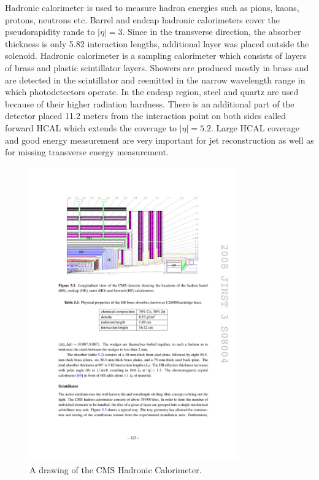 Hadronic calorimeter is used to measure hadron energies such as pions, kaons, protons, neutrons etc. Barrel and endcap hadronic calorimeters cover the pseudorapidity rande to $|\eta|=3$. 
Since in the transverse direction, the absorber thickness is only 5.82 interaction lengths, additional layer was placed outside the solenoid.  Hadronic calorimeter is a sampling calorimeter which consists of layers of brass and plastic scintillator layers. Showers are produced mostly in brass and are detected in the scintillator and reemitted in the narrow wavelength range in which photodetectors operate. In the endcap region, steel and quartz are used because of their higher radiation hardness. There is an additional part of the detector placed 11.2 meters from the interaction point on both sides called forward HCAL which extends the coverage to $|\eta|=5.2$. Large HCAL coverage and good energy measurement are very important for jet reconstruction as well as for missing transverse energy measurement.  
\begin{figure}[htbp]
	\centering
		\includegraphics[width=0.8\textwidth]{Figures/HCAL.pdf}
	\caption[CMS Hadronic Calorimeter]{A drawing of the CMS Hadronic Calorimeter. \cite{Chatrchyan:2008aa}}
	\label{fig:HCAL}
\end{figure}


